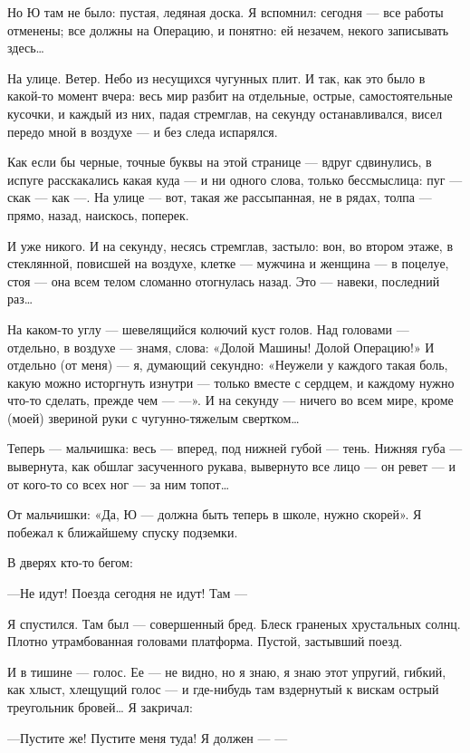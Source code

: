 \documentclass[11pt,openany]{book}
\begin{document}
Но Ю там не было: пустая, ледяная доска. Я вспомнил: сегодня --- все работы отменены; все должны на Операцию, и понятно: ей незачем, некого записывать здесь\ldots{}

На улице. Ветер. Небо из несущихся чугунных плит. И так, как это было в какой-то момент вчера: весь мир разбит на отдельные, острые, самостоятельные кусочки, и каждый из них, падая стремглав, на секунду останавливался, висел передо мной в воздухе --- и без следа испарялся.

Как если бы черные, точные буквы на этой странице --- вдруг сдвинулись, в испуге расскакались какая куда --- и ни одного слова, только бессмыслица: пуг --- скак --- как ---. На улице --- вот, такая же рассыпанная, не в рядах, толпа --- прямо, назад, наискось, поперек.

И уже никого. И на секунду, несясь стремглав, застыло: вон, во втором этаже, в стеклянной, повисшей на воздухе, клетке --- мужчина и женщина --- в поцелуе, стоя --- она всем телом сломанно отогнулась назад. Это --- навеки, последний раз\ldots{}

На каком-то углу --- шевелящийся колючий куст голов. Над головами --- отдельно, в воздухе --- знамя, слова: «Долой Машины! Долой Операцию!» И отдельно (от меня) --- я, думающий секундно: «Неужели у каждого такая боль, какую можно исторгнуть изнутри --- только вместе с сердцем, и каждому нужно что-то сделать, прежде чем --- ---». И на секунду --- ничего во всем мире, кроме (моей) звериной руки с чугунно-тяжелым свертком\ldots{}

Теперь --- мальчишка: весь --- вперед, под нижней губой --- тень. Нижняя губа --- вывернута, как обшлаг засученного рукава, вывернуто все лицо --- он ревет --- и от кого-то со всех ног --- за ним топот\ldots{}

От мальчишки: «Да, Ю --- должна быть теперь в школе, нужно скорей». Я побежал к ближайшему спуску подземки.

В дверях кто-то бегом:

---Не идут! Поезда сегодня не идут! Там ---

Я спустился. Там был --- совершенный бред. Блеск граненых хрустальных солнц. Плотно утрамбованная головами платформа. Пустой, застывший поезд.

И в тишине --- голос. Ее --- не видно, но я знаю, я знаю этот упругий, гибкий, как хлыст, хлещущий голос --- и где-нибудь там вздернутый к вискам острый треугольник бровей\ldots{} Я закричал:

---Пустите же! Пустите меня туда! Я должен --- ---
\end{document}
